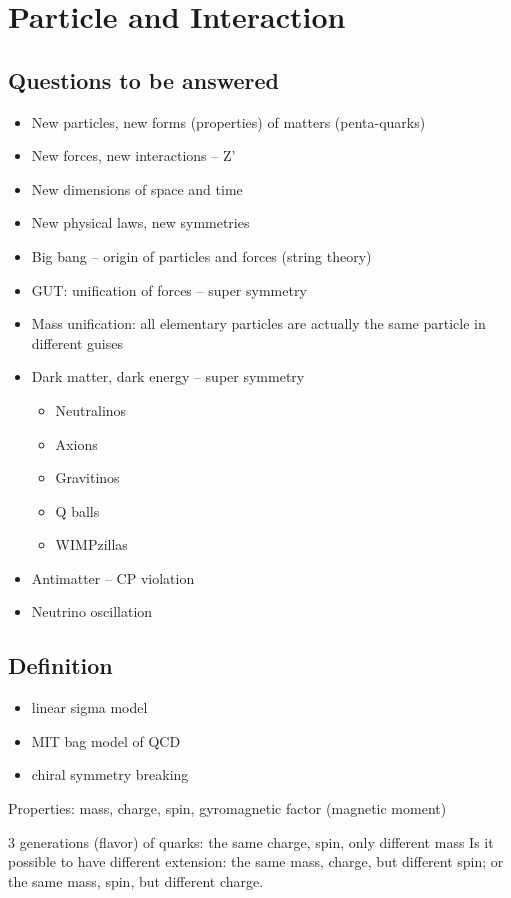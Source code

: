 \section{Particle and Interaction}
\subsection{Questions to be answered}
\begin{itemize}
    \item New particles, new forms (properties) of matters (penta-quarks)
    \item New forces, new interactions -- Z'
    \item New dimensions of space and time
    \item New physical laws, new symmetries
    \item Big bang -- origin of particles and forces (string theory)
    \item GUT: unification of forces -- super symmetry
    \item Mass unification: all elementary particles are actually the same particle in different guises
    \item Dark matter, dark energy -- super symmetry
	\begin{itemize}
	    \item Neutralinos
	    \item Axions
	    \item Gravitinos
	    \item Q balls
	    \item WIMPzillas
	\end{itemize}
    \item Antimatter -- CP violation
    \item Neutrino oscillation
\end{itemize}

\subsection{Definition} 
\begin{itemize}
    \item linear sigma model
    \item MIT bag model of QCD
    \item chiral symmetry breaking
\end{itemize}
Properties: mass, charge, spin, gyromagnetic factor (magnetic moment)

3 generations (flavor) of quarks: the same charge, spin, only different mass
Is it possible to have different extension: the same mass, charge, but different spin; or the same mass, spin, but different charge.

